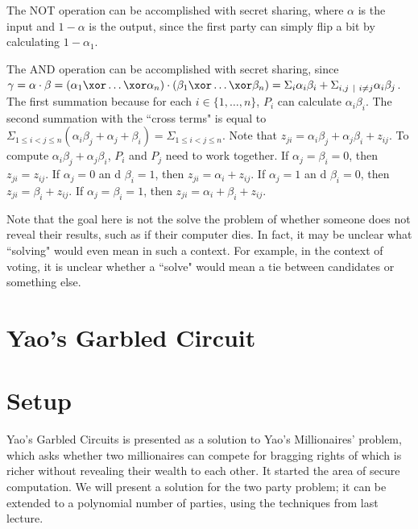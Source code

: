 The NOT operation can be accomplished with secret sharing, where $\alpha$ is the input and $1 - \alpha$ is the output, since the first party can simply flip a bit by calculating $1 - \alpha_1$.

The AND operation can be accomplished with secret sharing, since $\gamma = \alpha \cdot \beta = (\alpha_1 \xor \dots \xor \alpha_n) \cdot (\beta_1 \xor \dots \xor \beta_n) = \Sigma_i \alpha_i \beta_i + \Sigma_{i,j\ |\ i \ne j} \alpha_i \beta_j$. The first summation because for each $i \in \{1, \dots, n\}$, $P_i$ can calculate $\alpha_i \beta_i$. The second summation with the ``cross terms" is equal to $\Sigma_{1 \leq i < j \leq n}(\alpha_i \beta_j + \alpha_j + \beta_i) = \Sigma_{1 \leq i < j \leq n}$. Note that $z_{ji} = \alpha_i\beta_j + \alpha_j\beta_i + z_{ij}$. To compute $\alpha_i \beta_j + \alpha_j \beta_i$, $P_i$ and $P_j$ need to work together. If $\alpha_j = \beta_i = 0$, then $z_{ji} = z_{ij}$. If $\alpha_j = 0$ an d $\beta_i = 1$, then $z_{ji} = \alpha_i + z_{ij}$. If $\alpha_j = 1$ an d $\beta_i = 0$, then $z_{ji} = \beta_i + z_{ij}$. If $\alpha_j = \beta_i = 1$, then $z_{ji} = \alpha_i + \beta_i + z_{ij}$.

Note that the goal here is not the solve the problem of whether someone does not reveal their results, such as if their computer dies. In fact, it may be unclear what ``solving" would even mean in such a context. For example, in the context of voting, it is unclear whether a ``solve" would mean a tie between candidates or something else.

\section{Yao's Garbled Circuit}


%

\section{Setup}


Yao's Garbled Circuits is presented as a solution to Yao's Millionaires' problem, 
which asks whether 
two millionaires can compete for bragging rights of which is richer
without revealing their wealth to each other. 
It started the area of secure computation. 
We will present a solution for the two party problem;
it can be extended to a polynomial number of parties,
using the techniques from last lecture.

